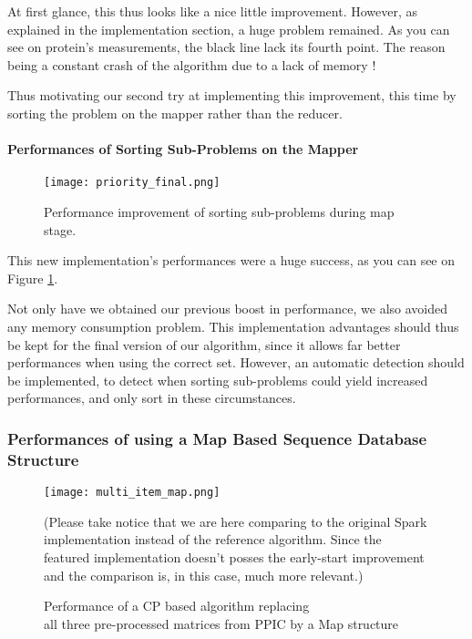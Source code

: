 \documentclass{eplmastersthesis}
\begin{document}
At first glance, this thus looks like a nice little improvement. However, as explained in the implementation section, a huge problem remained. As you can see on protein's measurements, the black line lack its fourth point. The reason being a constant crash of the algorithm due to a lack of memory ! \newline

Thus motivating our second try at implementing this improvement, this time by sorting the problem on the mapper rather than the reducer.

\paragraph{Performances of Sorting Sub-Problems on the Mapper}

\begin{figure}[h]
  \centering
  \texttt{[image: priority\_final.png]}
  \caption{Performance improvement of sorting sub-problems during map stage.}
  \label{fig:priority_scheduling_improved}
\end{figure}

This new implementation's performances were a huge success, as you can see on Figure \ref{fig:priority_scheduling_improved}. \newline

Not only have we obtained our previous boost in performance, we also avoided any memory consumption problem. This implementation advantages should thus be kept for the final version of our algorithm, since it allows far better performances when using the correct set. However, an automatic detection should be implemented, to detect when sorting sub-problems could yield increased performances, and only sort in these circumstances.

\subsubsection{Performances of using a Map Based Sequence Database Structure}

\begin{figure}[h]
  \centering
  \texttt{[image: multi\_item\_map.png]}
  \caption[Map based - multi\_item algorithm]{
  		Performance of a CP based algorithm replacing \\
  		all three pre-processed matrices from PPIC by a Map structure
  	\endtabular
  }
  (Please take notice that we are here comparing to the original Spark implementation instead of the reference algorithm. Since the featured implementation doesn't posses the early-start improvement and the comparison is, in this case, much more relevant.)
  \label{fig:multi_map}
\end{figure}
\end{document}
